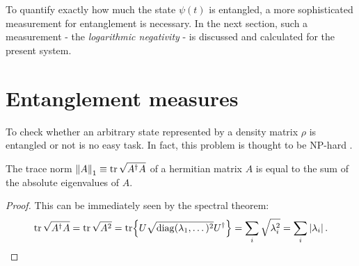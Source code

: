 To quantify exactly how much the state $\psi(t)$ is entangled, a more sophisticated measurement for entanglement is necessary. In the next section, such a measurement - the \emph{logarithmic negativity} - is discussed and calculated for the present system.

\section{Entanglement measures}
To check whether an arbitrary state represented by a density matrix $\rho$ is entangled or not is no easy task. In fact, this problem is thought to be NP-hard \cite{Gurvits_2003}.






\begin{lemma}\label{lemma:trace-norm-hermitian}
  The trace norm $\left\lVert A\right\rVert_1 \equiv \tr \sqrt{A^\dagger A}$ of a hermitian matrix $A$ is equal to the sum of the absolute eigenvalues of $A$.
\end{lemma}
\begin{proof}
  This can be immediately seen by the spectral theorem:
  \begin{equation*}
    \tr \sqrt{A^\dagger A} = \tr \sqrt{A^2} = \tr{U\sqrt{\operatorname{diag}(\lambda_1, \dots)^2}U^\dagger} = \sum_i \sqrt{\lambda_i^2} = \sum_i \left\lvert\lambda_i\right\rvert.
  \end{equation*}
\end{proof}

